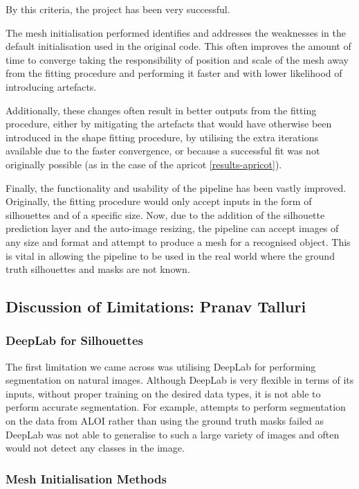 \documentclass{article}
\begin{document}
By this criteria, the project has been very successful.

The mesh initialisation performed identifies and addresses the weaknesses in the default initialisation used in the original code. This often improves the amount of time to converge taking the responsibility of position and scale of the mesh away from the fitting procedure and performing it faster and with lower likelihood of introducing artefacts.

Additionally, these changes often result in better outputs from the fitting procedure, either by mitigating the artefacts that would have otherwise been introduced in the shape fitting procedure, by utilising the extra iterations available due to the faster convergence, or because a successful fit was not originally possible (as in the case of the apricot \ref{results-apricot}).

Finally, the functionality and usability of the pipeline has been vastly improved. Originally, the fitting procedure would only accept inputs in the form of silhouettes and of a specific size. Now, due to the addition of the silhouette prediction layer and the auto-image resizing, the pipeline can accept images of any size and format and attempt to produce a mesh for a recognised object. This is vital in allowing the pipeline to be used in the real world where the ground truth silhouettes and masks are not known.

\subsection{Discussion of Limitations: Pranav Talluri}

\subsubsection{DeepLab for Silhouettes}

The first limitation we came across was utilising DeepLab for performing segmentation on natural images. Although DeepLab is very flexible in terms of its inputs, without proper training on the desired data types, it is not able to perform accurate segmentation. For example, attempts to perform segmentation on the data from ALOI rather than using the ground truth masks failed as DeepLab was not able to generalise to such a large variety of images and often would not detect any classes in the image.

\subsubsection{Mesh Initialisation Methods}
\end{document}
